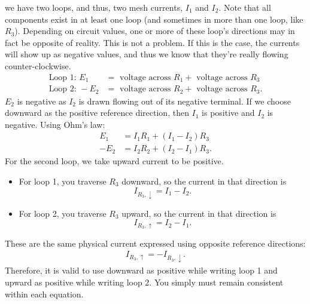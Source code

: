\documentclass{report}
\begin{document}
\begin{itemize}
                \bigbreak \noindent 
                \bigbreak \noindent 
                we have two loops, and thus, two mesh currents, $I_1$ and $I_2$. Note that all components exist in at least one loop (and sometimes in more than one loop, like $R_3$). Depending on circuit values, one or more of these loop's directions may in fact be opposite of reality. This is not a problem. If this is the case, the currents will show up as negative values, and thus we know that they're really flowing counter-clockwise.
                \begin{align*}
                    \text{Loop 1: } E_{1} &= \text{ voltage across } R_{1} + \text{ voltage across } R_{3} \\
                    \text{Loop 2: } -E_{2} &= \text{ voltage across } R_{2} + \text{ voltage across } R_{3}
                .\end{align*}
                $E_2$ is negative as $I_2$ is drawn flowing out of its negative terminal. If we choose downward as the positive reference direction, then \(I_1\) is positive and \(I_2\) is negative. Using Ohm's law:
                \begin{align*}
                    E_{1} &= I_{1}R_{1} + (I_{1} - I_{2})R_{3} \\
                    -E_{2} &= I_{2}R_{2} + (I_{2} - I_{1})R_{3}
                .\end{align*}
                For the second loop, we take upward current to be positive.
                \begin{itemize}
                    \item For loop 1, you traverse \(R_3\) downward, so the current in that direction is
                    \[
                        I_{R_3,\downarrow}=I_1-I_2.
                    \]
                \item For loop 2, you traverse \(R_3\) upward, so the current in that direction is
                    \[
                        I_{R_3,\uparrow}=I_2-I_1.
                    \]
            \end{itemize}
            These are the same physical current expressed using opposite reference directions:
            \begin{align*}
                I_{R_3,\uparrow}=-I_{R_3,\downarrow}
            .\end{align*}
            Therefore, it is valid to use downward as positive while writing loop 1 and upward as positive while writing loop 2. You simply must remain consistent within each equation.

\end{itemize}
\end{document}

